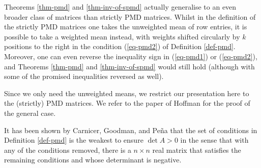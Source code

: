 \documentclass[11pt]{article}
\begin{document}
\begin{remark}
    Theorems \ref{thm-pmd} and \ref{thm-inv-of-spmd} actually generalise to an even broader class of matrices than strictly PMD matrices. Whilst in the definition of the strictly PMD matrices one takes the unweighted mean of row entries, it is possible to take a weighted mean instead, with weights shifted circularly by $k$ positions to the right in the condition (\ref{eq-pmd2}) of Definition \ref{def-pmd}. Moreover, one can even reverse the inequality sign in (\ref{eq-pmd1}) or (\ref{eq-pmd2}), and Theorems \ref{thm-pmd} and \ref{thm-inv-of-spmd} would still hold (although with some of the promised inequalities reversed as well).
    
    Since we only need the unweighted means, we restrict our presentation here to the (strictly) PMD matrices. We refer to the paper of Hoffman \cite{hoffman1965nonsingularity} for the proof of the general case.
\end{remark}

\begin{remark}
    It has been shown by Carnicer, Goodman, and Pe\~na \cite{carnicer1999linear} that the set of conditions in Definition \ref{def-pmd} is the weakest to ensure $\det A>0$ in the sense that with any of the conditions removed, there is a $n\times n$ real matrix that satisfies the remaining conditions and whose determinant is negative.
\end{remark}
\end{document}
